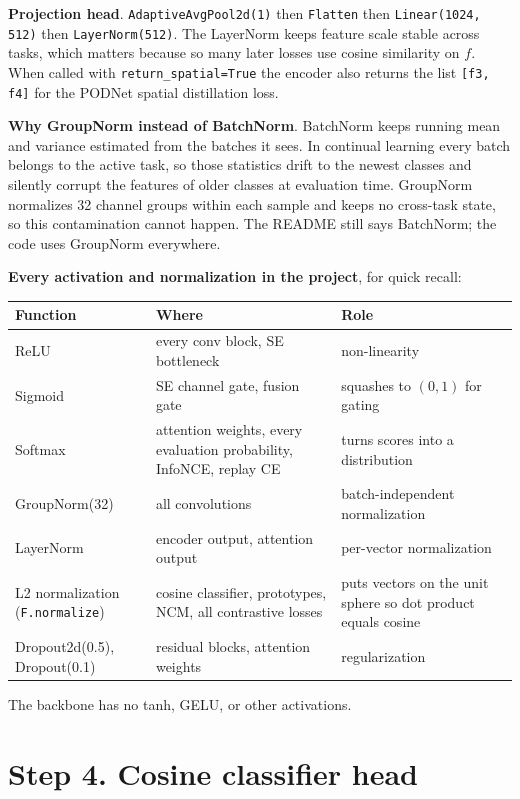 \documentclass[11pt,a4paper]{article}
\newcommand{\code}[1]{\texttt{#1}}
\begin{document}
\textbf{Projection head}. \code{AdaptiveAvgPool2d(1)} then \code{Flatten} then \code{Linear(1024, 512)} then \code{LayerNorm(512)}. The LayerNorm keeps feature scale stable across tasks, which matters because so many later losses use cosine similarity on $f$. When called with \code{return\_spatial=True} the encoder also returns the list \code{[f3, f4]} for the PODNet spatial distillation loss.

\textbf{Why GroupNorm instead of BatchNorm}. BatchNorm keeps running mean and variance estimated from the batches it sees. In continual learning every batch belongs to the active task, so those statistics drift to the newest classes and silently corrupt the features of older classes at evaluation time. GroupNorm normalizes 32 channel groups within each sample and keeps no cross-task state, so this contamination cannot happen. The README still says BatchNorm; the code uses GroupNorm everywhere.

\textbf{Every activation and normalization in the project}, for quick recall:

\begin{tabularx}{\textwidth}{L{3.8cm} Y L{4.6cm}}
\toprule
Function & Where & Role \\
\midrule
ReLU & every conv block, SE bottleneck & non-linearity \\
Sigmoid & SE channel gate, fusion gate & squashes to $(0, 1)$ for gating \\
Softmax & attention weights, every evaluation probability, InfoNCE, replay CE & turns scores into a distribution \\
GroupNorm(32) & all convolutions & batch-independent normalization \\
LayerNorm & encoder output, attention output & per-vector normalization \\
L2 normalization (\code{F.normalize}) & cosine classifier, prototypes, NCM, all contrastive losses & puts vectors on the unit sphere so dot product equals cosine \\
Dropout2d(0.5), Dropout(0.1) & residual blocks, attention weights & regularization \\
\bottomrule
\end{tabularx}

The backbone has no tanh, GELU, or other activations.

\section{Step 4. Cosine classifier head}
\end{document}
